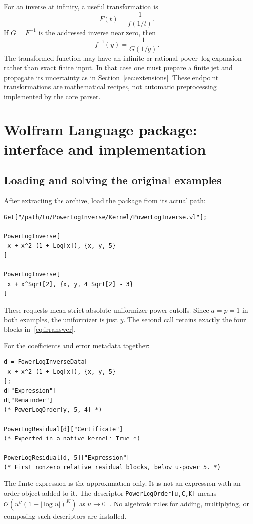 \documentclass[11pt,a4paper]{article}
\numberwithin{equation}{section}
\theoremstyle{definition}
\theoremstyle{remark}
\newcommand{\OO}{\mathcal O}
\newcommand{\code}[1]{\texttt{#1}}
\begin{document}
For an inverse at infinity, a useful transformation is
\[
 F(t)=\frac1{f(1/t)}.
\]
If $G=F^{-1}$ is the addressed inverse near zero, then
\[
 f^{-1}(y)=\frac1{G(1/y)}.
\]
The transformed function may have an infinite or rational power--log
expansion rather than exact finite input. In that case one must prepare a
finite jet and propagate its uncertainty as in
Section~\ref{sec:extensions}. These endpoint transformations are
mathematical recipes, not automatic preprocessing implemented by the core
parser.

\section{Wolfram Language package: interface and implementation}
\label{sec:package}

\subsection{Loading and solving the original examples}

After extracting the archive, load the package from its actual path:
\begin{lstlisting}
Get["/path/to/PowerLogInverse/Kernel/PowerLogInverse.wl"];

PowerLogInverse[
 x + x^2 (1 + Log[x]), {x, y, 5}
]

PowerLogInverse[
 x + x^Sqrt[2], {x, y, 4 Sqrt[2] - 3}
]
\end{lstlisting}
These requests mean strict absolute uniformizer-power cutoffs. Since
$a=p=1$ in both examples, the uniformizer is just $y$. The second call
retains exactly the four blocks in~\eqref{eq:irranswer}.

\noindent\begin{minipage}{\linewidth}
For the coefficients and error metadata together:
\begin{lstlisting}
d = PowerLogInverseData[
 x + x^2 (1 + Log[x]), {x, y, 5}
];
d["Expression"]
d["Remainder"]
(* PowerLogOrder[y, 5, 4] *)

PowerLogResidual[d]["Certificate"]
(* Expected in a native kernel: True *)

PowerLogResidual[d, 5]["Expression"]
(* First nonzero relative residual blocks, below u-power 5. *)
\end{lstlisting}
\end{minipage}

The finite expression is the approximation only. It is not an expression
with an order object added to it. The descriptor
\code{PowerLogOrder[u,C,K]} means
$\OO(u^C(1+|\log u|)^K)$ as $u\to0^+$. No algebraic rules for adding,
multiplying, or composing such descriptors are installed.
\end{document}
